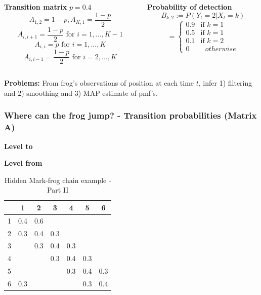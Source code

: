 \documentclass[xcolor=dvipsnames, compress]{beamer}
\begin{document}
\begin{frame}
\begin{columns}
\begin{column}{0.5\textwidth}
\textbf{Transition matrix}
$p=0.4$
$$A_{1,2} = 1-p, A_{K,1} = \frac{1-p}{2}$$
$$ A_{i,i+1} = \frac{1-p}{2} \mbox{ for } i=1,\ldots, K-1$$
$$ A_{i,i} = p \mbox{ for } i=1,\ldots, K$$
$$ A_{i,i-1} = \frac{1-p}{2} \mbox{ for } i=2,\ldots, K$$
\end{column}
\begin{column}{0.5\textwidth}  %
\textbf{Probability of detection}
$$B_{k,2}:= P(Y_t=2|X_t=k) $$ 
$$=\begin{cases} 0.9 &\mbox{if } k=1 \\
0.5 & \mbox{if } k=1 \\
0.1 & \mbox{if } k=2 \\
0 & \mbox{ } otherwise
\end{cases}$$	

\end{column}
\end{columns}

\vspace{0.5cm}

\textbf{Problems:} From frog’s observations of position at each time $t$, infer 1) filtering and 2) smoothing and 3) MAP estimate of pmf's.

\end{frame}

%
\begin{frame}
\frametitle{Where can the frog jump? - Transition probabilities (Matrix A)}

\begin{center}
\begin{table}
\begin{centering}
\textbf{Level to}
\par\end{centering}
\begin{centering}
\textbf{Level from}
\begin{tabular}{|c|c|c|c|c|c|c|}
\hline 
& 1 & 2 & 3 & 4 & 5 & 6\tabularnewline
\hline 
\hline 
1 & 0.4 & 0.6 &  &  &  & \tabularnewline
\hline 
2 & 0.3 & 0.4 & 0.3 &  &  & \tabularnewline
\hline 
3 &  & 0.3 & 0.4 & 0.3 &  & \tabularnewline
\hline 
4 &  &  & 0.3 & 0.4 & 0.3 & \tabularnewline
\hline 
5 &  &  &  & 0.3 & 0.4 & 0.3\tabularnewline
\hline 
6 & 0.3 &  &  &  & 0.3 & 0.4\tabularnewline
\hline 
\end{tabular}
\par\end{centering}
\caption{Hidden Mark-frog chain example - Part II}

\end{table}
\par\end{center}
\end{frame}
%
\end{document}
